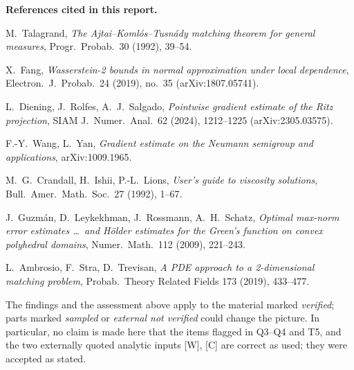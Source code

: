 \documentclass[11pt]{article}
\begin{document}
\smallskip
\noindent\textbf{References cited in this report.}
{\small
\begin{description}[leftmargin=2.4em,itemsep=0pt,topsep=2pt,parsep=0pt]
  \item[{[T]}] M.\ Talagrand, \emph{The Ajtai--Koml\'os--Tusn\'ady matching theorem for general measures}, Progr.\ Probab.\ 30 (1992), 39--54.
  \item[{[F]}] X.\ Fang, \emph{Wasserstein-2 bounds in normal approximation under local dependence}, Electron.\ J.\ Probab.\ 24 (2019), no.\ 35 (arXiv:1807.05741).
  \item[{[D]}] L.\ Diening, J.\ Rolfes, A.\ J.\ Salgado, \emph{Pointwise gradient estimate of the Ritz projection}, SIAM J.\ Numer.\ Anal.\ 62 (2024), 1212--1225 (arXiv:2305.03575).
  \item[{[W]}] F.-Y.\ Wang, L.\ Yan, \emph{Gradient estimate on the Neumann semigroup and applications}, arXiv:1009.1965.
  \item[{[C]}] M.\ G.\ Crandall, H.\ Ishii, P.-L.\ Lions, \emph{User's guide to viscosity solutions}, Bull.\ Amer.\ Math.\ Soc.\ 27 (1992), 1--67.
  \item[{[GLRS]}] J.\ Guzm\'an, D.\ Leykekhman, J.\ Rossmann, A.\ H.\ Schatz, \emph{Optimal max-norm error estimates \dots\ and H\"older estimates for the Green's function on convex polyhedral domains}, Numer.\ Math.\ 112 (2009), 221--243.
  \item[{[AST]}] L.\ Ambrosio, F.\ Stra, D.\ Trevisan, \emph{A PDE approach to a 2-dimensional matching problem}, Probab.\ Theory Related Fields 173 (2019), 433--477.
\end{description}
}

\medskip
\noindent The findings and the assessment above apply to the material marked \emph{verified};
parts marked \emph{sampled} or \emph{external not verified} could change the picture. In
particular, no claim is made here that the items flagged in Q3--Q4 and T5, and the two
externally quoted analytic inputs [W], [C] are correct as used; they were accepted as
stated.
\end{document}
